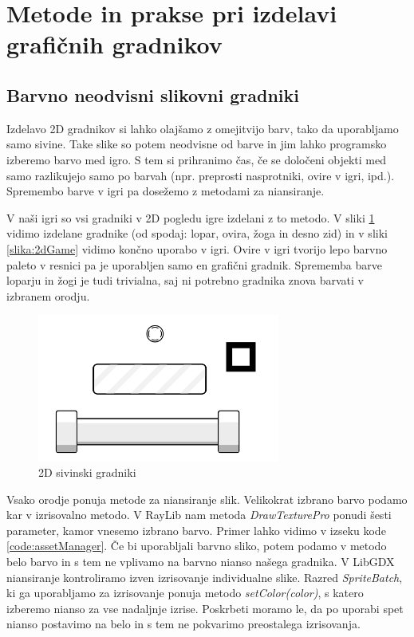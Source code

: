 \documentclass[12pt,a4paper,twoside]{book}
\begin{document}
\section{Metode in prakse pri izdelavi grafičnih gradnikov}
\subsection{Barvno neodvisni slikovni gradniki}
Izdelavo 2D gradnikov si lahko olajšamo z omejitvijo barv, tako da uporabljamo samo sivine. Take slike so potem neodvisne od barve in jim lahko programsko izberemo barvo med igro. S tem si prihranimo čas, če se določeni objekti med samo razlikujejo samo po barvah (npr. preprosti nasprotniki, ovire v igri, ipd.). Spremembo barve v igri pa dosežemo z metodami za niansiranje.

V naši igri so vsi gradniki v 2D pogledu igre izdelani z to metodo. V sliki \ref{slika:grayscaleSprites} vidimo izdelane gradnike (od spodaj: lopar, ovira, žoga in desno zid) in v sliki \ref{slika:2dGame} vidimo končno uporabo v igri. Ovire v igri tvorijo lepo barvno paleto v resnici pa je uporabljen samo en grafični gradnik. Sprememba barve loparju in žogi je tudi trivialna, saj ni potrebno gradnika znova barvati v izbranem orodju. 

\begin{figure}[h]
	\centering
	\includegraphics[width=8cm]{grayscaleSprites}
	\caption{2D sivinski gradniki}
	\label{slika:grayscaleSprites}
\end{figure}

Vsako orodje ponuja metode za niansiranje slik. Velikokrat izbrano barvo podamo kar v izrisovalno metodo. V RayLib nam metoda \textit{DrawTexturePro} ponudi šesti parameter, kamor vnesemo izbrano barvo. Primer lahko vidimo v izseku kode \ref{code:assetManager}. Če bi uporabljali barvno sliko, potem podamo v metodo belo barvo in s tem ne vplivamo na barvno nianso našega gradnika. V LibGDX niansiranje kontroliramo izven izrisovanje individualne slike. Razred \textit{SpriteBatch}, ki ga uporabljamo za izrisovanje ponuja metodo \textit{setColor(color)}, s katero izberemo nianso za vse nadaljnje izrise. Poskrbeti moramo le, da po uporabi spet nianso postavimo na belo in s tem ne pokvarimo preostalega izrisovanja.
\end{document}
